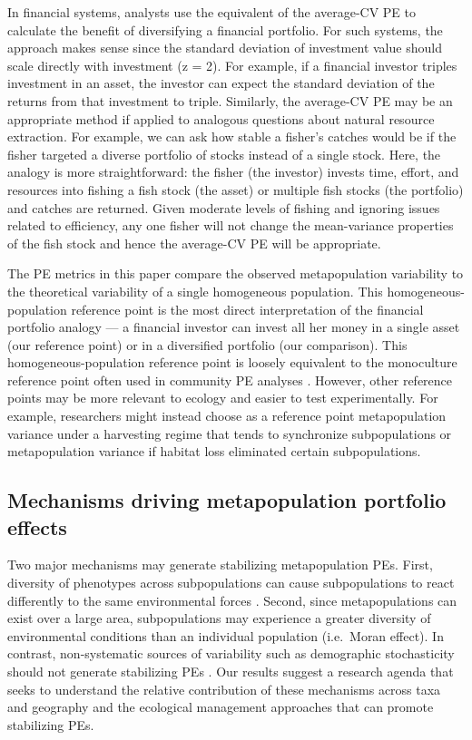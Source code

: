 In financial systems, analysts use the equivalent of the average-CV PE to
calculate the benefit of diversifying a financial portfolio. For such systems,
the approach makes sense since the standard deviation of investment value should
scale directly with investment (z = 2). For example, if a financial investor
triples investment in an asset, the investor can expect the standard deviation
of the returns from that investment to triple. Similarly, the average-CV PE may
be an appropriate method if applied to analogous questions about natural
resource extraction. For example, we can ask how stable a fisher's catches would
be if the fisher targeted a diverse portfolio of stocks instead of a single
stock. Here, the analogy is more straightforward: the fisher (the investor)
invests time, effort, and resources into fishing a fish stock (the asset) or
multiple fish stocks (the portfolio) and catches are returned. Given moderate
levels of fishing and ignoring issues related to efficiency, any one fisher
will not change the mean-variance properties of the fish stock and hence the
average-CV PE will be appropriate.

The PE metrics in this paper compare the observed metapopulation variability to
the theoretical variability of a single homogeneous population. This
homogeneous-population reference point is the most direct interpretation of the
financial portfolio analogy --- a financial investor can invest all her money
in a single asset (our reference point) or in a diversified portfolio (our
comparison). This homogeneous-population reference point is loosely equivalent
to the monoculture reference point often used in community PE analyses
\citep[e.g. Equation 7 in][]{thibaut2012}. However, other reference points
may be more relevant to ecology and easier to test experimentally. For example,
researchers might instead choose as a reference point metapopulation variance
under a harvesting regime that tends to synchronize subpopulations or
metapopulation variance if habitat loss eliminated certain subpopulations.

\subsection{Mechanisms driving metapopulation portfolio effects}

Two major mechanisms may generate stabilizing metapopulation PEs.
First, diversity of phenotypes across subpopulations can cause subpopulations
to react differently to the same environmental forces \citep[response
diversity;][]{elmqvist2003}. Second, since metapopulations can exist over
a large area, subpopulations may experience a greater diversity of
environmental conditions than an individual population (i.e.\ Moran effect). In
contrast, non-systematic sources of variability such as demographic
stochasticity should not generate stabilizing PEs \citep{loreau2008}. Our
results suggest a research agenda that seeks to understand the relative
contribution of these mechanisms across taxa and geography and the ecological
management approaches that can promote stabilizing PEs.

